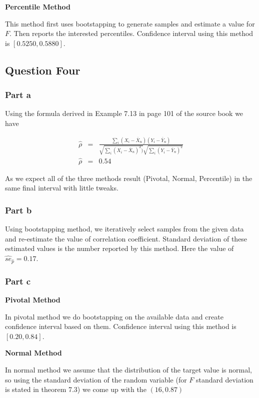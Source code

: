 \documentclass[12pt, a4paper]{book}
\begin{document}
\textbf{Percentile Method}

This method first uses bootstapping to generate samples and estimate a value for $F$. Then reports the
interested percentiles. Confidence interval using this method is $[0.5250, 0.5880]$.

\subsection*{Question Four}

\subsubsection*{Part a}

Using the formula derived in Example 7.13 in page 101 of the source book we have

\begin{eqnarray*}
    \hat{\rho} & = & \frac{\sum_i (X_i - \overline{X}_n)(Y_i - \overline{Y}_n)}{\sqrt{\sum_i (X_i - \overline{X}_n)^2)} \sqrt{\sum_i(Y_i - \overline{Y}_n)^2}} \\
    \hat{\rho} & = & 0.54
\end{eqnarray*}

As we expect all of the three methods result (Pivotal, Normal, Percentile) in the same final interval with little tweaks.

\subsubsection*{Part b}

Using bootstapping method, we iteratively select samples from the given data and re-estimate the value of
correlation coefficient. Standard deviation of these estimated values is the number reported by this method.
Here the value of $\hat{se}_{\hat{p}} = 0.17$.

\subsubsection*{Part c}

\textbf{Pivotal Method}

In pivotal method we do bootstapping on the available data and create confidence interval based on them.
Confidence interval using this method is $[0.20, 0.84]$.

\textbf{Normal Method}

In normal method we assume that the distribution of the target value is normal, so using the standard deviation
of the random variable (for $F$ standard deviation is stated in theorem 7.3) we come up with the
$(16, 0.87)$
\end{document}

